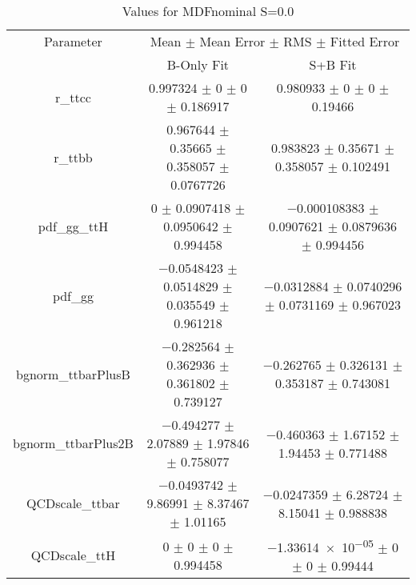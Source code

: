\begin{table}
\centering
\caption{Values for MDFnominal S=0.0}
\begin{tabular}{ccc}
\toprule
Parameter & \multicolumn{2}{c}{Mean $\pm$ Mean Error $\pm$ RMS $\pm$ Fitted Error}\\
 & B-Only Fit & S+B Fit\\
\midrule
r\_ttcc & \num{0.997324} $\pm$ \num{0} $\pm$ \num{0} $\pm$ \num{0.186917} & \num{0.980933} $\pm$ \num{0} $\pm$ \num{0} $\pm$ \num{0.19466}\\
r\_ttbb & \num{0.967644} $\pm$ \num{0.35665} $\pm$ \num{0.358057} $\pm$ \num{0.0767726} & \num{0.983823} $\pm$ \num{0.35671} $\pm$ \num{0.358057} $\pm$ \num{0.102491}\\
pdf\_gg\_ttH & \num{0} $\pm$ \num{0.0907418} $\pm$ \num{0.0950642} $\pm$ \num{0.994458} & \num{-0.000108383} $\pm$ \num{0.0907621} $\pm$ \num{0.0879636} $\pm$ \num{0.994456}\\
pdf\_gg & \num{-0.0548423} $\pm$ \num{0.0514829} $\pm$ \num{0.035549} $\pm$ \num{0.961218} & \num{-0.0312884} $\pm$ \num{0.0740296} $\pm$ \num{0.0731169} $\pm$ \num{0.967023}\\
bgnorm\_ttbarPlusB & \num{-0.282564} $\pm$ \num{0.362936} $\pm$ \num{0.361802} $\pm$ \num{0.739127} & \num{-0.262765} $\pm$ \num{0.326131} $\pm$ \num{0.353187} $\pm$ \num{0.743081}\\
bgnorm\_ttbarPlus2B & \num{-0.494277} $\pm$ \num{2.07889} $\pm$ \num{1.97846} $\pm$ \num{0.758077} & \num{-0.460363} $\pm$ \num{1.67152} $\pm$ \num{1.94453} $\pm$ \num{0.771488}\\
QCDscale\_ttbar & \num{-0.0493742} $\pm$ \num{9.86991} $\pm$ \num{8.37467} $\pm$ \num{1.01165} & \num{-0.0247359} $\pm$ \num{6.28724} $\pm$ \num{8.15041} $\pm$ \num{0.988838}\\
QCDscale\_ttH & \num{0} $\pm$ \num{0} $\pm$ \num{0} $\pm$ \num{0.994458} & \num{-1.33614e-05} $\pm$ \num{0} $\pm$ \num{0} $\pm$ \num{0.99444}\\
\bottomrule
\end{tabular}
\end{table}